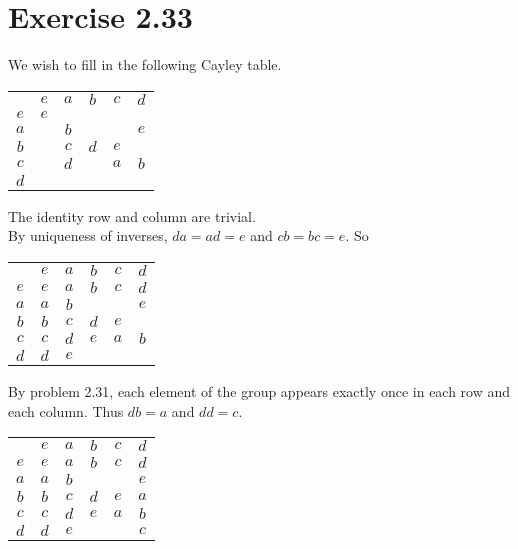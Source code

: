 \documentclass{article}
\begin{document}
\section*{Exercise 2.33}
We wish to fill in the following Cayley table.
\begin{center}
    \begin{tabular}{c | c c c c c}
        & $e$ & $a$ & $b$ & $c$ & $d$  \\
       \cline{1-6}
       $e$ & $e$         & \tun{\ \ \ } & \tun{\ \ \ } & \tun{\ \ \ } & \tun{\ \ \ } \\
       $a$ & \tun{\ \ \ } & $b$         & \tun{\ \ \ } & \tun{\ \ \ } & $e$ \\
       $b$ & \tun{\ \ \ } & $c$         & $d$         & $e$         & \tun{\ \ \ } \\
       $c$ & \tun{\ \ \ } & $d$         & \tun{\ \ \ } & $a$         & $b$ \\
       $d$ & \tun{\ \ \ } & \tun{\ \ \ } & \tun{\ \ \ } & \tun{\ \ \ } & \tun{\ \ \ } \\
   \end{tabular}
\end{center}
The identity row and column are trivial. \\
By uniqueness of inverses, \(da=ad=e\) and \(cb=bc=e\). So
\begin{center}
    \begin{tabular}{c | c c c c c}
        & $e$ & $a$ & $b$ & $c$ & $d$  \\
       \cline{1-6}
       $e$ & $e$ & $a$ & $b$ & $c$ & $d$ \\
       $a$ & $a$ & $b$         & \tun{\ \ \ } & \tun{\ \ \ } & $e$ \\
       $b$ & $b$ & $c$         & $d$         & $e$         & \tun{\ \ \ } \\
       $c$ & $c$ & $d$         & $e$         & $a$         & $b$ \\
       $d$ & $d$ & $e$ & \tun{\ \ \ } & \tun{\ \ \ } & \tun{\ \ \ } \\
   \end{tabular}
\end{center}
By problem 2.31, each element of the group appears exactly once in each row and each column. Thus \(db=a\) and \(dd=c\).
\begin{center}
    \begin{tabular}{c | c c c c c}
        & $e$ & $a$ & $b$ & $c$ & $d$  \\
       \cline{1-6}
       $e$ & $e$ & $a$ & $b$ & $c$ & $d$ \\
       $a$ & $a$ & $b$         & \tun{\ \ \ } & \tun{\ \ \ } & $e$ \\
       $b$ & $b$ & $c$ & $d$ & $e$ & $a$ \\
       $c$ & $c$ & $d$ & $e$ & $a$ & $b$ \\
       $d$ & $d$ & $e$ & \tun{\ \ \ } & \tun{\ \ \ } & $c$ \\
   \end{tabular}
\end{center}
\end{document}
